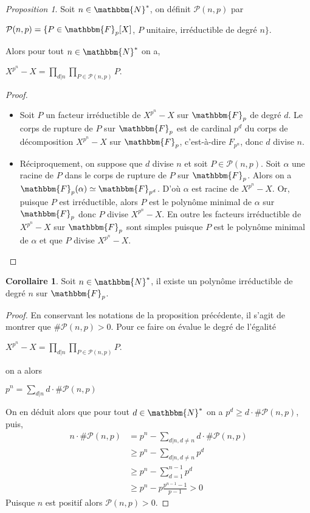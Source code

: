 \documentclass[12pt]{article}
\theoremstyle{remark}\newtheorem{note}{Note}
\theoremstyle{remark}\newtheorem{nota}{Notation}
\newcommand{\N}{\mathbbm{N}}
\newcommand{\F}{\mathbbm{F}}
\newtheorem{prop}{Proposition}
\theoremstyle{definition}
\newtheorem{coro}{Corollaire}
\begin{document}
\begin{prop}
Soit $n \in \N^{*}$, on définit $\mathcal{P} (n,p)$ par
\begin{center}
$\mathcal{P} (n,p) = \{ P \in \F_p [X]$, $P$ unitaire, irréductible de degré $n \}$.
\end{center}
Alors pour tout $n \in \N^{*}$ on a,
\begin{center}
$\displaystyle X^{p^n} - X = \prod_{d | n} \prod_{P \in \mathcal{P}(n,p)} P.$
\end{center}
\end{prop}
\begin{proof}
\begin{itemize}
\item Soit $P$ un facteur irréductible de $X^{p^n} - X$ sur $\F_p$ de degré $d$. Le corps de rupture de $P$ sur $\F_p$ est de cardinal $p^d$ du corps de décomposition $X^{p^n} - X$ sur $\F_p$, c'est-à-dire $F_{p^n}$, donc $d$ divise $n$.
\item Réciproquement, on suppose que $d$ divise $n$ et soit $P \in \mathcal{P} (n,p)$. Soit $\alpha$ une racine de $P$ dans le corps de rupture de $P$ sur $\F_p$. Alors on a $\F_p (\alpha) \simeq \F_{p^d}$. D'où $\alpha$ est racine de $X^{p^n} - X$. Or, puisque $P$ est irréductible, alors $P$ est le polynôme minimal de $\alpha$ sur $\F_p$ donc $P$ divise $X^{p^n} - X$. En outre les facteurs irréductible de $X^{p^n} - X$ sur $\F_p$ sont simples puisque $P$ est le polynôme minimal de $\alpha$ et que $P$ divise $X^{p^n} - X$.
\end{itemize}
\end{proof}
\begin{coro}
Soit $n \in \N^{*}$, il existe un polynôme irréductible de degré $n$ sur $\F_p$.
\end{coro}
\begin{proof}
En conservant les notations de la proposition précédente, il s'agit de montrer que $\# \mathcal{P} (n,p) > 0$. Pour ce faire on évalue le degré de l'égalité
\begin{center}
$\displaystyle X^{p^n} - X = \prod_{d | n} \prod_{P \in \mathcal{P}(n,p)} P.$
\end{center}
on a alors
\begin{center}
$\displaystyle p^n = \sum_{d | n} d \cdot \# \mathcal{P} (n,p)$
\end{center}
On en déduit alors que pour tout $d \in \N^{*}$ on a $p^d \geq d \cdot \# \mathcal{P} (n,p)$, puis,
\begin{align*}
\displaystyle
n \cdot \# \mathcal{P} (n,p) &= p^n - \sum_{d | n , d \neq n} d \cdot \# \mathcal{P} (n,p)\\
&\geq p^n - \sum_{d | n , d \neq n} p^d\\
&\geq p^n - \sum_{d =1}^{n-1} p^d\\
&\geq p^n - p \frac{p^{n-1} - 1}{p-1} > 0
\end{align*}
Puisque $n$ est positif alors $\mathcal{P} (n,p) > 0$.
\end{proof}
\end{document}
